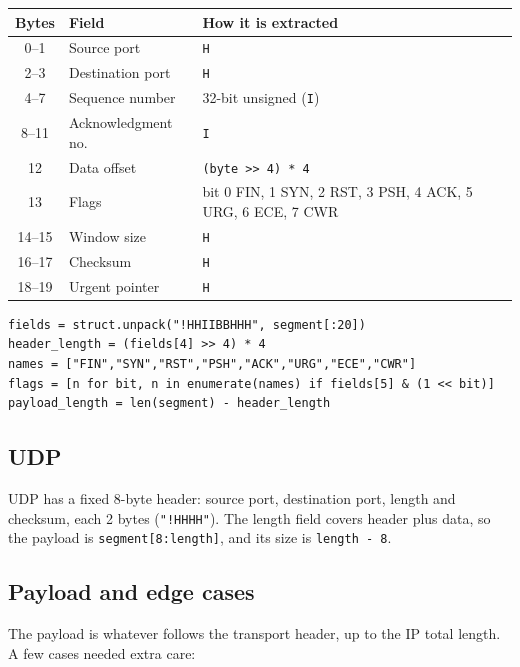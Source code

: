 \documentclass[11pt,a4paper]{article}
\begin{document}
\begin{center}
\begin{tabular}{@{}cll@{}}
\toprule
\textbf{Bytes} & \textbf{Field} & \textbf{How it is extracted} \\
\midrule
0--1   & Source port         & \texttt{H} \\
2--3   & Destination port    & \texttt{H} \\
4--7   & Sequence number     & 32-bit unsigned (\texttt{I}) \\
8--11  & Acknowledgment no.  & \texttt{I} \\
12     & Data offset         & \texttt{(byte >> 4) * 4} \\
13     & Flags               & bit 0 FIN, 1 SYN, 2 RST, 3 PSH, 4 ACK, 5 URG, 6 ECE, 7 CWR \\
14--15 & Window size         & \texttt{H} \\
16--17 & Checksum            & \texttt{H} \\
18--19 & Urgent pointer      & \texttt{H} \\
\bottomrule
\end{tabular}
\end{center}

\begin{lstlisting}[style=py]
fields = struct.unpack("!HHIIBBHHH", segment[:20])
header_length = (fields[4] >> 4) * 4
names = ["FIN","SYN","RST","PSH","ACK","URG","ECE","CWR"]
flags = [n for bit, n in enumerate(names) if fields[5] & (1 << bit)]
payload_length = len(segment) - header_length
\end{lstlisting}

\subsection{UDP}

UDP has a fixed 8-byte header: source port, destination port, length and
checksum, each 2 bytes (\texttt{"!HHHH"}). The length field covers header plus
data, so the payload is \texttt{segment[8:length]}, and its size is
\texttt{length - 8}.

\subsection{Payload and edge cases}

The payload is whatever follows the transport header, up to the IP total
length. A few cases needed extra care:
\end{document}
